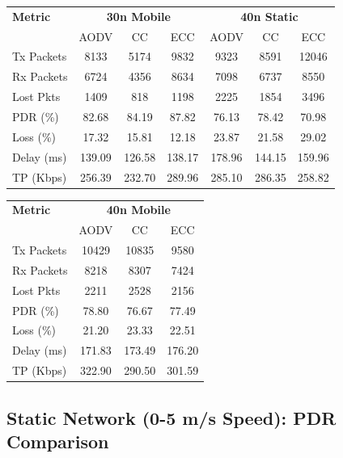 \documentclass[12pt]{article}
\begin{document}
\begin{center}
\begin{tabular}{l|ccc|ccc}
\toprule
\textbf{Metric} & \multicolumn{3}{c}{\textbf{30n Mobile}} & \multicolumn{3}{c}{\textbf{40n Static}} \\
 & AODV & CC & ECC & AODV & CC & ECC \\
\midrule
Tx Packets & 8133 & 5174 & 9832 & 9323 & 8591 & 12046 \\
Rx Packets & 6724 & 4356 & 8634 & 7098 & 6737 & 8550 \\
Lost Pkts & 1409 & 818 & 1198 & 2225 & 1854 & 3496 \\
PDR (\%) & 82.68 & 84.19 & 87.82 & 76.13 & 78.42 & 70.98 \\
Loss (\%) & 17.32 & 15.81 & 12.18 & 23.87 & 21.58 & 29.02 \\
Delay (ms) & 139.09 & 126.58 & 138.17 & 178.96 & 144.15 & 159.96 \\
TP (Kbps) & 256.39 & 232.70 & 289.96 & 285.10 & 286.35 & 258.82 \\
\bottomrule
\end{tabular}
\end{center}

\begin{center}
\begin{tabular}{l|ccc}
\toprule
\textbf{Metric} & \multicolumn{3}{c}{\textbf{40n Mobile}} \\
 & AODV & CC & ECC \\
\midrule
Tx Packets & 10429 & 10835 & 9580 \\
Rx Packets & 8218 & 8307 & 7424 \\
Lost Pkts & 2211 & 2528 & 2156 \\
PDR (\%) & 78.80 & 76.67 & 77.49 \\
Loss (\%) & 21.20 & 23.33 & 22.51 \\
Delay (ms) & 171.83 & 173.49 & 176.20 \\
TP (Kbps) & 322.90 & 290.50 & 301.59 \\
\bottomrule
\end{tabular}
\end{center}

\subsection*{Static Network (0-5 m/s Speed): PDR Comparison}
\end{document}

